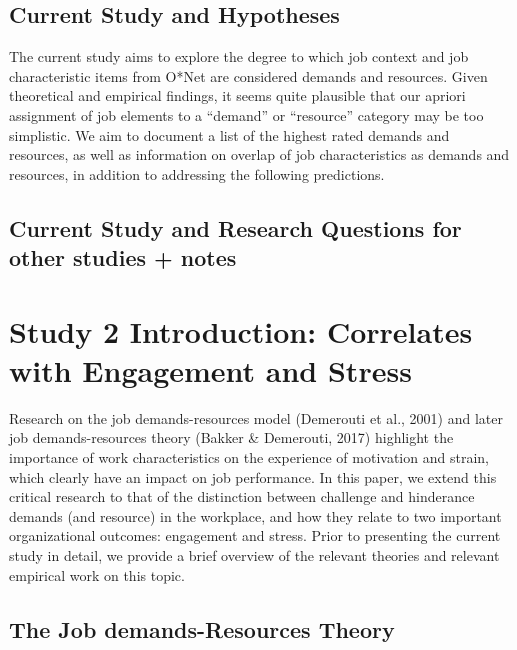 \documentclass[
  english,
  man]{apa6}
\begin{document}
\hypertarget{current-study-and-hypotheses}{%
\subsection{Current Study and Hypotheses}\label{current-study-and-hypotheses}}

The current study aims to explore the degree to which job context and job characteristic items from O*Net are considered demands and resources. Given theoretical and empirical findings, it seems quite plausible that our apriori assignment of job elements to a \enquote{demand} or \enquote{resource} category may be too simplistic. We aim to document a list of the highest rated demands and resources, as well as information on overlap of job characteristics as demands and resources, in addition to addressing the following predictions.

\hypertarget{current-study-and-research-questions-for-other-studies-notes}{%
\subsection{Current Study and Research Questions for other studies + notes}\label{current-study-and-research-questions-for-other-studies-notes}}

\hypertarget{study-2-introduction-correlates-with-engagement-and-stress}{%
\section{Study 2 Introduction: Correlates with Engagement and Stress}\label{study-2-introduction-correlates-with-engagement-and-stress}}

Research on the job demands-resources model (Demerouti et al., 2001) and later job demands-resources theory (Bakker \& Demerouti, 2017) highlight the importance of work characteristics on the experience of motivation and strain, which clearly have an impact on job performance. In this paper, we extend this critical research to that of the distinction between challenge and hinderance demands (and resource) in the workplace, and how they relate to two important organizational outcomes: engagement and stress. Prior to presenting the current study in detail, we provide a brief overview of the relevant theories and relevant empirical work on this topic.

\hypertarget{the-job-demands-resources-theory-1}{%
\subsection{The Job demands-Resources Theory}\label{the-job-demands-resources-theory-1}}
\end{document}
